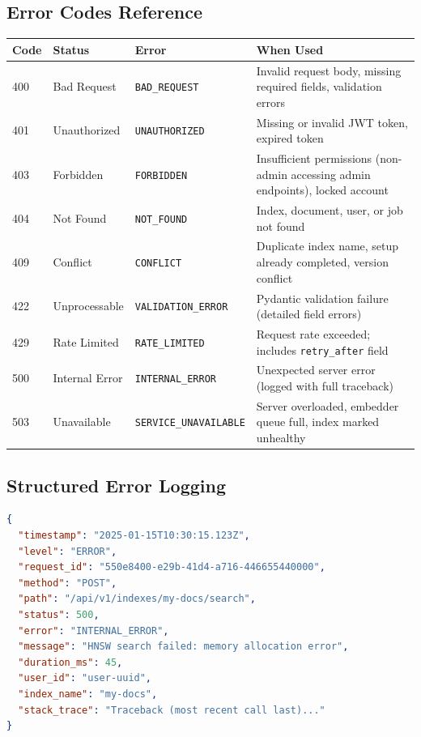 \documentclass[11pt,a4paper]{article}
\begin{document}
\subsection{Error Codes Reference}

\begin{longtable}{@{}p{1cm}p{1.5cm}p{4cm}p{7cm}@{}}
\toprule
\textbf{Code} & \textbf{Status} & \textbf{Error} & \textbf{When Used} \\
\midrule
\endhead
400 & Bad Request & \texttt{BAD\_REQUEST} & Invalid request body, missing required fields, validation errors \\
401 & Unauthorized & \texttt{UNAUTHORIZED} & Missing or invalid JWT token, expired token \\
403 & Forbidden & \texttt{FORBIDDEN} & Insufficient permissions (non-admin accessing admin endpoints), locked account \\
404 & Not Found & \texttt{NOT\_FOUND} & Index, document, user, or job not found \\
409 & Conflict & \texttt{CONFLICT} & Duplicate index name, setup already completed, version conflict \\
422 & Unprocessable & \texttt{VALIDATION\_ERROR} & Pydantic validation failure (detailed field errors) \\
429 & Rate Limited & \texttt{RATE\_LIMITED} & Request rate exceeded; includes \texttt{retry\_after} field \\
500 & Internal Error & \texttt{INTERNAL\_ERROR} & Unexpected server error (logged with full traceback) \\
503 & Unavailable & \texttt{SERVICE\_UNAVAILABLE} & Server overloaded, embedder queue full, index marked unhealthy \\
\bottomrule
\end{longtable}

\subsection{Structured Error Logging}

\begin{lstlisting}[language=JSON,title={Structured Log Entry (JSON output mode)}]
{
  "timestamp": "2025-01-15T10:30:15.123Z",
  "level": "ERROR",
  "request_id": "550e8400-e29b-41d4-a716-446655440000",
  "method": "POST",
  "path": "/api/v1/indexes/my-docs/search",
  "status": 500,
  "error": "INTERNAL_ERROR",
  "message": "HNSW search failed: memory allocation error",
  "duration_ms": 45,
  "user_id": "user-uuid",
  "index_name": "my-docs",
  "stack_trace": "Traceback (most recent call last)..."
}
\end{lstlisting}
\end{document}

